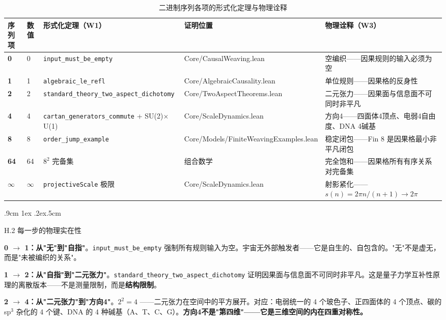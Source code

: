 \documentclass[aps,prd,twocolumn,nofootinbib,floatfix]{revtex4-2}
\makeatletter
\def\subsection{%
  \@startsection{subsection}{2}{\z@}
    {.9cm \@plus1ex \@minus .2ex}{.5cm}
    {\normalfont\large\bfseries\raggedright}%
}
\makeatother
\begin{document}
\begin{table}[!t]
\centering
\scriptsize
\begin{tabular}{p{1.2cm}p{0.8cm}p{4.5cm}p{5cm}p{4cm}}
\hline
序列项 & 数值 & 形式化定理（W1） & 证明位置 & 物理诠释（W3） \\
\hline
\textbf{0} & 0 & \texttt{input\_must\_be\_empty} & Core/CausalWeaving.lean & 空编织——因果规则的输入必须为空 \\
\textbf{1} & 1 & \texttt{algebraic\_le\_refl} & Core/AlgebraicCausality.lean & 单位规则——因果格的反身性 \\
\textbf{2} & 2 & \texttt{standard\_theory\_two\_aspect\_dichotomy} & Core/TwoAspectTheorems.lean & 二元张力——因果面与信息面不可同时非平凡 \\
\textbf{4} & 4 & \texttt{cartan\_generators\_commute} + SU(2)$\times$U(1) & Core/ScaleDynamics.lean & 方向4——四面体4顶点、电弱4自由度、DNA 4碱基 \\
\textbf{8} & 8 & \texttt{order\_jump\_example} & Core/Models/FiniteWeavingExamples.lean & 稳定闭包——Fin 8 是因果格最小非平凡闭包 \\
\textbf{64} & 64 & $8^2$ 完备集 & 组合数学 & 完全饱和——因果格所有有序关系对完备集 \\
\textbf{$\infty$} & $\infty$ & \texttt{projectiveScale} 极限 & Core/ScaleDynamics.lean & 射影紧化——$s(n) = 2\pi n/(n+1) \to 2\pi$ \\
\hline
\end{tabular}
\caption{二进制序列各项的形式化定理与物理诠释}
\label{tab:binary_sequence}
\end{table}

\subsection{H.2 每一步的物理实在性}

\textbf{0 $\to$ 1：从"无"到"自指"}。\texttt{input\_must\_be\_empty} 强制所有规则输入为空。宇宙无外部触发者——它是自生的、自包含的。"无"不是虚无，而是"未被编织的关系"。

\textbf{1 $\to$ 2：从"自指"到"二元张力"}。\texttt{standard\_theory\_two\_aspect\_dichotomy} 证明因果面与信息面不可同时非平凡。这是量子力学互补性原理的离散版本——不是测量限制，而是\textbf{结构限制}。

\textbf{2 $\to$ 4：从"二元张力"到"方向4"}。$2^2 = 4$ ——二元张力在空间中的平方展开。对应：电弱统一的 4 个玻色子、正四面体的 4 个顶点、碳的 sp$^3$ 杂化的 4 个键、DNA 的 4 种碱基（A、T、C、G）。\textbf{方向4不是"第四维"——它是三维空间的内在四重对称性。}
\end{document}
